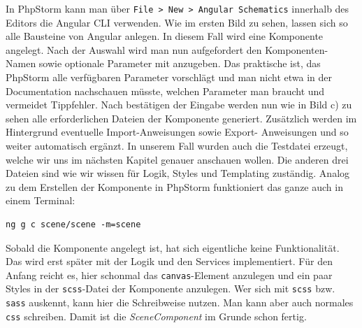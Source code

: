 %
In PhpStorm kann man über \lstinline{File > New > Angular Schematics} innerhalb des Editors die Angular CLI verwenden. Wie im ersten Bild zu sehen, lassen sich so alle Bausteine von Angular anlegen. In diesem Fall wird eine Komponente angelegt. Nach der Auswahl wird man nun aufgefordert den Komponenten-Namen sowie optionale Parameter mit anzugeben. Das praktische ist, das PhpStorm alle verfügbaren Parameter vorschlägt und man nicht etwa in der Documentation nachschauen müsste, welchen Parameter man braucht und vermeidet Tippfehler. Nach bestätigen der Eingabe werden nun wie in Bild c) zu sehen alle erforderlichen Dateien der Komponente generiert. Zusätzlich werden im Hintergrund eventuelle Import-Anweisungen sowie Export- Anweisungen und so weiter automatisch ergänzt. In unserem Fall wurden auch die Testdatei erzeugt, welche wir uns im nächsten Kapitel genauer anschauen wollen. Die anderen drei Dateien sind wie wir wissen für Logik, Styles und Templating zuständig. Analog zu dem Erstellen der Komponente in PhpStorm funktioniert das ganze auch in einem Terminal:
%
\begin{lstlisting}
ng g c scene/scene -m=scene
\end{lstlisting}
%
Sobald die Komponente angelegt ist, hat sich eigentliche keine Funktionalität. Das wird erst später mit der Logik und den Services implementiert. Für den Anfang reicht es, hier schonmal das \texttt{canvas}-Element anzulegen und ein paar Styles in der \texttt{scss}-Datei der Komponente anzulegen. Wer sich mit \texttt{scss} bzw. \texttt{sass} auskennt, kann hier die Schreibweise nutzen. Man kann aber auch normales \texttt{css} schreiben. Damit ist die \textit{SceneComponent} im Grunde schon fertig.
